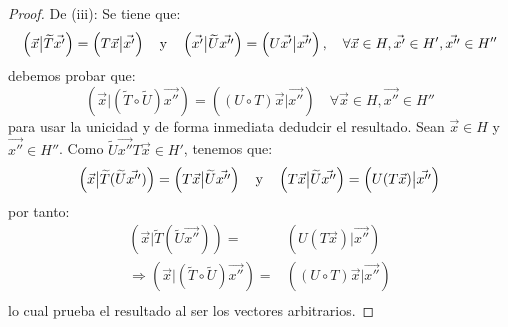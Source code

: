 \documentclass[12pt]{report}
\newcounter{it}
\theoremstyle{largebreak}
\newcommand\adj[1]{\ensuremath{\widetilde{#1}}}
\newcommand\pint[2]{\ensuremath{\left(#1\big|#2\right)}}
\begin{document}
\begin{proof}
        De (iii): Se tiene que:
        \begin{equation*}
            \pint{\vec{x}}{\adj{T}\vec{x'}}=\pint{T\vec{x}}{\vec{x'}}\quad\textup{y}\quad\pint{\vec{x'}}{\adj{U}\vec{x''}}=\pint{U\vec{x'}}{\vec{x''}},\quad\forall\vec{x}\in H,\vec{x'}\in H',\vec{x''}\in H''
        \end{equation*}
        debemos probar que:
        \begin{equation*}
            \pint{\vec{x}}{(\adj{T}\circ\adj{U})\vec{x''}}=\pint{(U\circ T)\vec{x}}{\vec{x''}}\quad\forall\vec{x}\in H,\vec{x''}\in H''
        \end{equation*}
        para usar la unicidad y de forma inmediata dedudcir el resultado.
        Sean $\vec{x}\in H$ y $\vec{x''}\in H''$. Como $\adj{U}\vec{x''}T\vec{x} \in H'$, tenemos que:
        \begin{equation*}
            \pint{\vec{x}}{\adj{T}(\adj{U}\vec{x''})}=\pint{T\vec{x}}{\adj{U}\vec{x''}}\quad\textup{y}\quad\pint{T\vec{x}}{\adj{U}\vec{x''}}=\pint{U(T\vec{x})}{\vec{x''}}
        \end{equation*}
        por tanto:
        \begin{equation*}
            \begin{split}
                \pint{\vec{x}}{\adj{T}(\adj{U}\vec{x''})}=&\pint{U(T\vec{x})}{\vec{x''}}\\
                \Rightarrow \pint{\vec{x}}{(\adj{T}\circ \adj{U})\vec{x''}}=&\pint{(U\circ T)\vec{x}}{\vec{x''}}\\
            \end{split}
        \end{equation*}
        lo cual prueba el resultado al ser los vectores arbitrarios.

    \end{proof}
\end{document}
